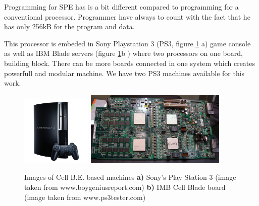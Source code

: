 \par
Programming for SPE has is a bit different compared to programming for a conventional processor.
Programmer have always to count with the fact that he has only 256kB for the program and data.

\par
This processor is embeded in Sony Playstation 3 (PS3, figure \ref{fg:cellmachines} a) game console as well as IBM Blade servers (figure \ref{fg:cellmachines}b ) where two processors on one board, building block.
There can be more boards connected in one system which creates powerfull and modular machine.
We have two PS3 machines available for this work.

\begin{figure}
    \centering
    \includegraphics[width=0.3\textwidth]{data/png/PS3}
    \includegraphics[width=0.6\textwidth]{data/png/ibm-cell-board}
    \caption[Cell B.E. based machines]{Images of Cell B.E. based machines
    \textbf{a)} Sony's Play Station 3 (image taken from www.boygeniusreport.com)
    \textbf{b)} IMB Cell Blade board (image taken from www.ps3tester.com)
}
    \label{fg:cellmachines}
\end{figure}

